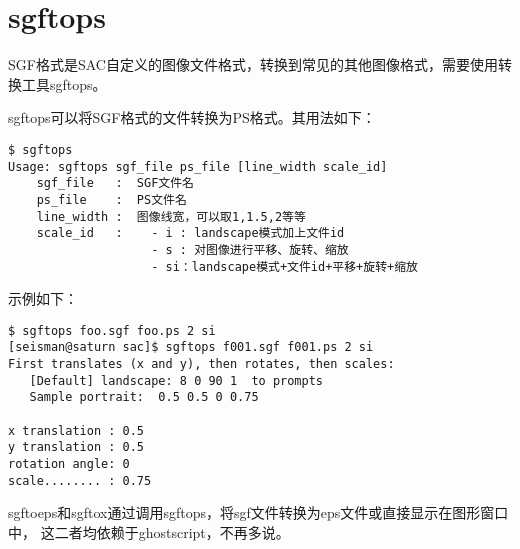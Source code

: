 \section{sgftops}
\label{sec:sgftops}
\label{sec:sgftoeps}
\label{sec:sgftox}

SGF格式是SAC自定义的图像文件格式，转换到常见的其他图像格式，需要使用转换工具sgftops。

sgftops可以将SGF格式的文件转换为PS格式。其用法如下：
\begin{verbatim}
$ sgftops
Usage: sgftops sgf_file ps_file [line_width scale_id]
    sgf_file   :  SGF文件名
    ps_file    :  PS文件名
    line_width :  图像线宽，可以取1,1.5,2等等
    scale_id   :    - i : landscape模式加上文件id
                    - s : 对图像进行平移、旋转、缩放
                    - si：landscape模式+文件id+平移+旋转+缩放
\end{verbatim}

示例如下：
\begin{verbatim}
$ sgftops foo.sgf foo.ps 2 si
[seisman@saturn sac]$ sgftops f001.sgf f001.ps 2 si
First translates (x and y), then rotates, then scales:
   [Default] landscape: 8 0 90 1  to prompts
   Sample portrait:  0.5 0.5 0 0.75

x translation : 0.5
y translation : 0.5
rotation angle: 0
scale........ : 0.75
\end{verbatim}

sgftoeps和sgftox通过调用sgftops，将sgf文件转换为eps文件或直接显示在图形窗口中，
这二者均依赖于ghostscript，不再多说。
